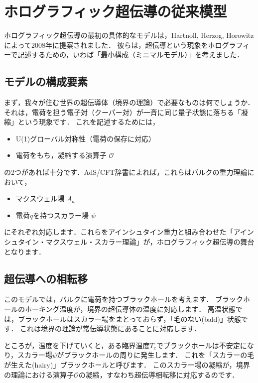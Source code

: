 \documentclass[b5paper,11pt,dvipdfmx]{jsarticle}
\numberwithin{equation}{section}
\theoremstyle{definition}
\begin{document}
\clearpage

\section{ホログラフィック超伝導の従来模型}

ホログラフィック超伝導の最初の具体的なモデルは，Hartnoll, Herzog, Horowitzによって2008年に提案されました\cite{Hartnoll08a, Hartnoll08b}．
彼らは，超伝導という現象をホログラフィーで記述するための，いわば「最小構成（ミニマルモデル）」を考えました．

\subsection{モデルの構成要素}

まず，我々が住む世界の超伝導体（境界の理論）で必要なものは何でしょうか．
それは，電荷を担う電子対（クーパー対）が一斉に同じ量子状態に落ちる「凝縮」という現象です．
これを記述するためには，
\begin{itemize}
    \item U(1)グローバル対称性（電荷の保存に対応）
    \item 電荷をもち，凝縮する演算子 $\mathcal{O}$
\end{itemize}
の2つがあれば十分です．AdS/CFT辞書によれば，これらはバルクの重力理論において，
\begin{itemize}
    \item マクスウェル場 $A_a$
    \item 電荷$q$を持つスカラー場 $\psi$
\end{itemize}
にそれぞれ対応します．これらをアインシュタイン重力と組み合わせた「アインシュタイン・マクスウェル・スカラー理論」が，ホログラフィック超伝導の舞台となります．

\subsection{超伝導への相転移}

このモデルでは，バルクに電荷を持つブラックホールを考えます．
ブラックホールのホーキング温度が，境界の超伝導体の温度に対応します．
高温状態では，ブラックホールはスカラー場をまとっておらず，「毛のない(bald)」状態です．
これは境界の理論が常伝導状態にあることに対応します．

ところが，温度を下げていくと，ある臨界温度$T_c$でブラックホールは不安定になり，スカラー場$\psi$がブラックホールの周りに発生します．
これを「スカラーの毛が生えた(hairy)」ブラックホールと呼びます\cite{Hartnoll08a}．
このスカラー場の凝縮が，境界の理論における演算子$\mathcal{O}$の凝縮，すなわち超伝導相転移に対応するのです．
\end{document}
